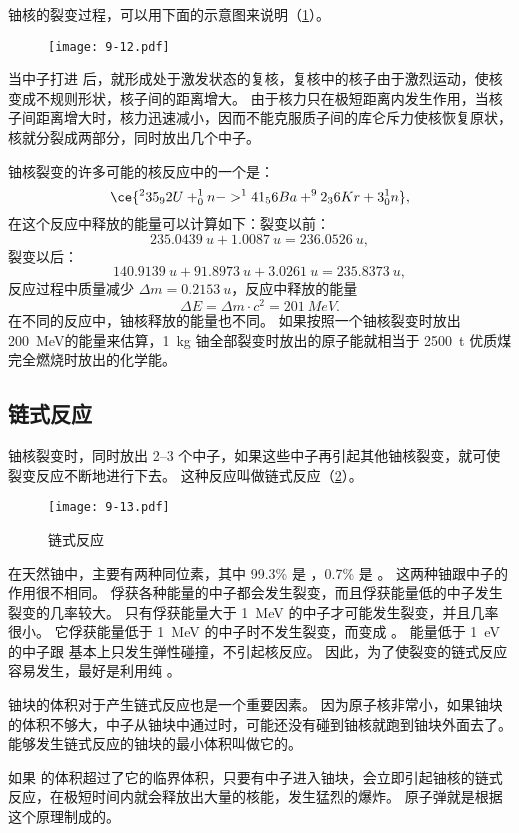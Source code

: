 铀核的裂变过程，可以用下面的示意图来说明（\cref{fig:9-12}）。
\begin{figure}
\texttt{[image: 9-12.pdf]}
\caption{}\label{fig:9-12}
\end{figure}

当中子打进  后，就形成处于激发状态的复核，复核中的核子由于激烈运动，使核变成不规则形状，核子间的距离增大。
由于核力只在极短距离内发生作用，当核子间距离增大时，核力迅速减小，因而不能克服质子间的库仑斥力使核恢复原状，核就分裂成两部分，同时放出几个中子。

铀核裂变的许多可能的核反应中的一个是：
\[ \ce{^235_92U +^1_0n -> ^141_56Ba +^92_36Kr + 3 ^1_0n },\]
在这个反应中释放的能量可以计算如下：裂变以前：
\[\qty{235.0439}{u}+\qty{1.0087}{u}=\qty{236.0526}{u},\]
裂变以后：
\[\qty{140.9139}{u}+\qty{91.8973}{u}+\qty{3.0261}{u}=\qty{235.8373}{u},\]
反应过程中质量减少 $\Delta m=\qty{0.2153}{u}$，反应中释放的能量
\[\Delta E=\Delta m\cdot c^2=\qty{201}{MeV}.\]
在不同的反应中，铀核释放的能量也不同。
如果按照一个铀核裂变时放出 \qty{200}{MeV}的能量来估算，\qty{1}{kg} 铀全部裂变时放出的原子能就相当于 \qty{2500}{t} 优质煤完全燃烧时放出的化学能。

\subsection{链式反应} 
铀核裂变时，同时放出 \numrange{2}{3} 个中子，如果这些中子再引起其他铀核裂变，就可使裂变反应不断地进行下去。
这种反应叫做链式反应（\cref{fig:9-13}）。
\begin{figure}
  \texttt{[image: 9-13.pdf]}
  \caption{链式反应}\label{fig:9-13}
\end{figure}

在天然铀中，主要有两种同位素，其中 99.3\% 是 ，0.7\% 是 。
这两种铀跟中子的作用很不相同。
 俘获各种能量的中子都会发生裂变，而且俘获能量低的中子发生裂变的几率较大。
 只有俘获能量大于 \qty{1}{MeV} 的中子才可能发生裂变，并且几率很小。
它俘获能量低于 \qty{1}{MeV} 的中子时不发生裂变，而变成 。
能量低于 \qty{1}{eV} 的中子跟  基本上只发生弹性碰撞，不引起核反应。
因此，为了使裂变的链式反应容易发生，最好是利用纯 。

铀块的体积对于产生链式反应也是一个重要因素。
因为原子核非常小，如果铀块的体积不够大，中子从铀块中通过时，可能还没有碰到铀核就跑到铀块外面去了。
能够发生链式反应的铀块的最小体积叫做它的。

如果  的体积超过了它的临界体积，只要有中子进入铀块，会立即引起铀核的链式反应，在极短时间内就会释放出大量的核能，发生猛烈的爆炸。
原子弹就是根据这个原理制成的。

